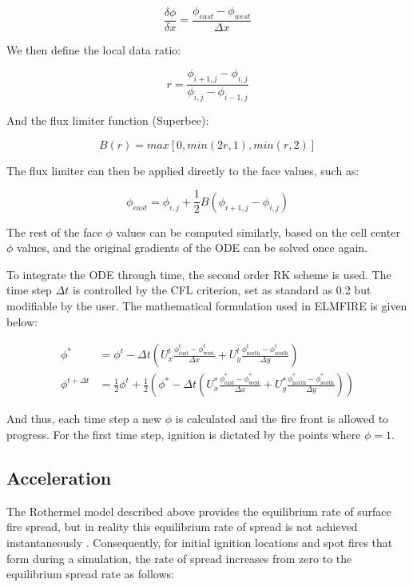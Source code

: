 \[
\frac{\delta \phi}{\delta x} = \frac{\phi_{east}-\phi_{west}}{\Delta x}
\]

We then define the local data ratio:

\[
r=\frac{\phi_{i+1,j} - \phi_{i,j}}{\phi_{i,j}-\phi_{i-1,j}}
\]

And the flux limiter function (Superbee):

\[
B(r) = max[0, min(2r,1),min(r,2)]
\]

The flux limiter can then be applied directly to the face values, such as:

\[
\phi_{east} = \phi_{i,j}+\frac{1}{2}B(\phi_{i+1,j}-\phi_{i,j})
\]

The rest of the face $\phi$ values can be computed similarly, based on the cell center $\phi$ values, and the original gradients of the ODE can be solved once again. 

To integrate the ODE through time, the second order RK scheme is used. The time step $\Delta t$ is controlled by the CFL criterion, set as standard as 0.2 but modifiable by the user. The mathematical formulation used in ELMFIRE is given below:

\begin{align}
\phi^{*} 
&= \phi^{t}
   - \Delta t \left(
        U_{x}^{t} \frac{\phi^{t}_{\text{east}} - \phi^{t}_{\text{west}}}{\Delta x}
      + U_{y}^{t} \frac{\phi^{t}_{\text{north}} - \phi^{t}_{\text{south}}}{\Delta y}
     \right)
\tag{10a}
\\[1em]
\phi^{t+\Delta t}
&= \tfrac{1}{2}\phi^{t}
   + \tfrac{1}{2}\left(
        \phi^{*}
        - \Delta t \left(
              U_{x}^{*} \frac{\phi^{*}_{\text{east}} - \phi^{*}_{\text{west}}}{\Delta x}
            + U_{y}^{*} \frac{\phi^{*}_{\text{north}} - \phi^{*}_{\text{south}}}{\Delta y}
        \right)
     \right)
\tag{10b}
\end{align}

And thus, each time step a new $\phi$ is calculated and the fire front is allowed to progress. For the first time step, ignition is dictated by the points where $\phi=1$.

\subsection{Acceleration}

The Rothermel model described above provides the equilibrium rate of surface fire spread, but in reality this equilibrium rate of spread is not achieved instantaneously \cite{finneyFARSITEFireArea1998, lautenbergerWildlandFireModeling2013}. Consequently, for initial ignition locations and spot fires that form during a simulation, the rate of spread increases from zero to the equilibrium spread rate as follows:

